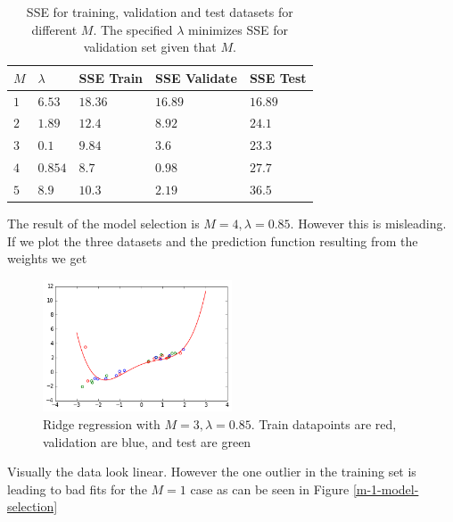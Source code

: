 \documentclass{article}
\begin{document}
\begin{table}
\begin{tabular}{|l|l|l|l|l|}
\hline 
$M$ & $\lambda$ & SSE Train & SSE Validate & SSE Test \\ \hline
$1$ & $6.53$ & $18.36$ & $16.89$ & $16.89$ \\ \hline
$2$ & $1.89$ & $12.4$ & $8.92$ & $24.1$ \\ \hline
$3$ & $0.1$ & $9.84$ & $3.6$ & $23.3$ \\ \hline
$4$ & $0.854$ & $8.7$ & $0.98$ & $27.7$ \\ \hline
$5$ & $8.9$ & $10.3$ & $2.19$ & $36.5$ \\
\hline
\end{tabular}
\label{model-selection}
\caption{SSE for training, validation and test datasets for different $M$. The specified $\lambda$ minimizes SSE for validation set given that $M$.}
\end{table}
%
%
The result of the model selection is $M=4,\lambda=0.85$. However this is misleading. If we plot the three datasets and the prediction function resulting from the weights we get
%
%
\begin{figure}[h]
\centering
\includegraphics[width=0.5\textwidth]{m-4-model-selection}
\caption{Ridge regression with $M = 3, \lambda = 0.85$. Train datapoints are red, validation are blue, and test are green}
\label{m-4-model-selection}
\end{figure}
%
%
Visually the data look linear. However the one outlier in the training set is leading to bad fits for the $M = 1$ case as can be seen in Figure \ref{m-1-model-selection}
\end{document}
